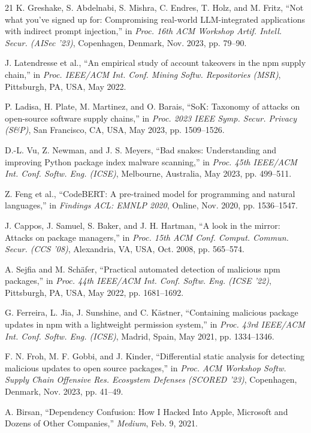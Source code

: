 \documentclass[journal]{IEEEtran}
\begin{document}
\begin{thebibliography}{21}
 K. Greshake, S. Abdelnabi, S. Mishra, C. Endres, T. Holz, and M. Fritz, ``Not what
you've signed up for: Compromising real-world LLM-integrated applications with indirect prompt injection,''
in \emph{Proc. 16th ACM Workshop Artif. Intell. Secur. (AISec '23)}, Copenhagen, Denmark, Nov. 2023, pp.
79--90.

 J. Latendresse et al., ``An empirical study of account takeovers in the npm
supply chain,'' in \emph{Proc. IEEE/ACM Int. Conf. Mining Softw. Repositories (MSR)}, Pittsburgh, PA, USA,
May 2022.

 P. Ladisa, H. Plate, M. Martinez, and O. Barais, ``SoK: Taxonomy of attacks on
open-source software supply chains,'' in \emph{Proc. 2023 IEEE Symp. Secur. Privacy (S\&P)}, San Francisco,
CA, USA, May 2023, pp. 1509--1526.

 D.-L. Vu, Z. Newman, and J. S. Meyers, ``Bad snakes: Understanding and improving Python
package index malware scanning,'' in \emph{Proc. 45th IEEE/ACM Int. Conf. Softw. Eng. (ICSE)}, Melbourne,
Australia, May 2023, pp. 499--511.

 Z. Feng et al., ``CodeBERT: A pre-trained model for programming and natural languages,''
in \emph{Findings ACL: EMNLP 2020}, Online, Nov. 2020, pp. 1536--1547.

 J. Cappos, J. Samuel, S. Baker, and J. H. Hartman, ``A look in the mirror: Attacks on
package managers,'' in \emph{Proc. 15th ACM Conf. Comput. Commun. Secur. (CCS '08)}, Alexandria, VA, USA,
Oct. 2008, pp. 565--574.

 A. Sejfia and M. Sch\"{a}fer, ``Practical automated detection of malicious npm
packages,'' in \emph{Proc. 44th IEEE/ACM Int. Conf. Softw. Eng. (ICSE '22)}, Pittsburgh, PA, USA, May 2022,
pp. 1681--1692.

 G. Ferreira, L. Jia, J. Sunshine, and C. K\"{a}stner, ``Containing malicious package
updates in npm with a lightweight permission system,'' in \emph{Proc. 43rd IEEE/ACM Int. Conf. Softw. Eng.
(ICSE)}, Madrid, Spain, May 2021, pp. 1334--1346.

 F. N. Froh, M. F. Gobbi, and J. Kinder, ``Differential static analysis for detecting
malicious updates to open source packages,'' in \emph{Proc. ACM Workshop Softw. Supply Chain Offensive Res.
Ecosystem Defenses (SCORED '23)}, Copenhagen, Denmark, Nov. 2023, pp. 41--49.

 A. Birsan, ``Dependency Confusion: How I Hacked Into Apple, Microsoft and Dozens of
Other Companies,'' \emph{Medium}, Feb. 9, 2021.

\end{thebibliography}
\end{document}
